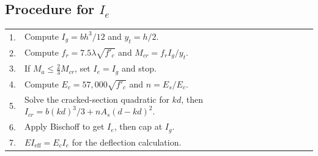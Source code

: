 \documentclass[10pt]{article}
\begin{document}
\subsection{Procedure for $I_e$}

{\ttfamily\footnotesize
\begin{tabular}{@{}p{0.25in}p{6.0in}@{}}
1. & Compute $I_g = b h^3 / 12$ and $y_t = h/2$. \\
2. & Compute $f_r = 7.5 \lambda \sqrt{f'_c}$ and $M_{cr} = f_r I_g / y_t$. \\
3. & If $M_a \leq \tfrac{2}{3} M_{cr}$, set $I_e = I_g$ and stop. \\
4. & Compute $E_c = 57{,}000 \sqrt{f'_c}$ and $n = E_s / E_c$. \\
5. & Solve the cracked-section quadratic for $kd$, then $I_{cr} = b (kd)^3 / 3 + n A_s (d - kd)^2$. \\
6. & Apply Bischoff to get $I_e$, then cap at $I_g$. \\
7. & $E I_{\text{eff}} = E_c I_e$ for the deflection calculation. \\
\end{tabular}
}
\end{document}
